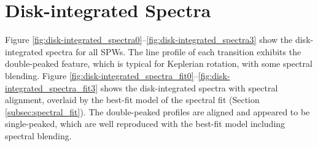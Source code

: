 \documentclass[twocolumn, twocolappendix, astrosymb, times]{aastex631}
\begin{document}





\section{Disk-integrated Spectra}\label{appendix:spectra}
Figure \ref{fig:disk-integrated_spectra0}--\ref{fig:disk-integrated_spectra3} show the disk-integrated spectra for all SPWs. The line profile of each transition exhibits the double-peaked feature, which is typical for Keplerian rotation, with some spectral blending. Figure \ref{fig:disk-integrated_spectra_fit0}--\ref{fig:disk-integrated_spectra_fit3} shows the disk-integrated spectra with spectral alignment, overlaid by the best-fit model of the spectral fit (Section \ref{subsec:spectral_fit}). The double-peaked profiles are aligned and appeared to be single-peaked, which are well reproduced with the best-fit model including spectral blending. 

\begin{figure*}
\caption{Disk-integrated spectra toward V883 Ori without spectral alignment. The emission is integrated over the deprojected disk region with the outer radius of 0 (or 240 au).}
\label{fig:disk-integrated_spectra0}
\end{figure*}

\begin{figure*}
\caption{Continuation of Figure \ref{fig:disk-integrated_spectra0}.}
\label{fig:disk-integrated_spectra1}
\end{figure*}

\begin{figure*}
\caption{Continuation of Figure \ref{fig:disk-integrated_spectra1}.}
\label{fig:disk-integrated_spectra2}
\end{figure*}
\end{document}
